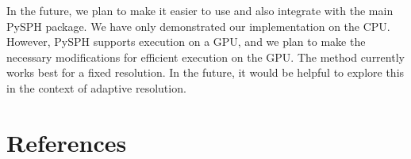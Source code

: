 \documentclass[preprint,12pt]{elsarticle}
\begin{document}
In the future, we plan to make it easier to use and also integrate with the
main PySPH package. We have only demonstrated our implementation on the CPU.
However, PySPH supports execution on a GPU, and we plan to make the necessary
modifications for efficient execution on the GPU. The method currently works
best for a fixed resolution. In the future, it would be helpful to explore
this in the context of adaptive resolution.


\section*{References}


\end{document}
